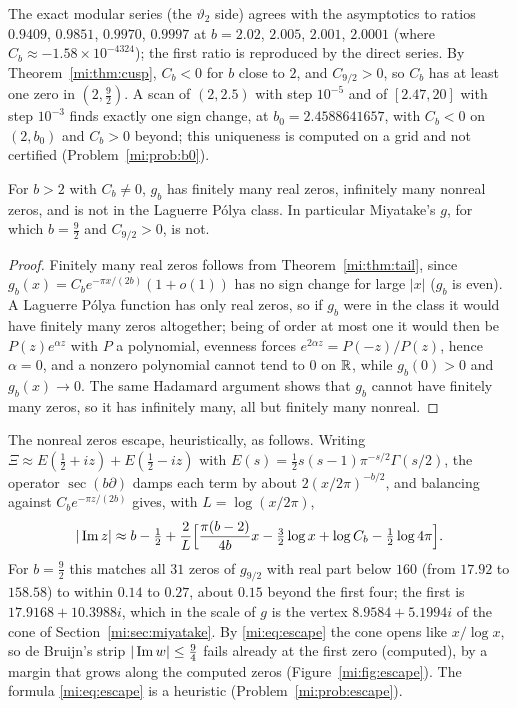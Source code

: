 The exact modular series (the $\vartheta_2$ side) agrees with the asymptotics to ratios $0.9409$, $0.9851$, $0.9970$, $0.9997$ at $b=2.02$, $2.005$, $2.001$, $2.0001$ (where $C_b\approx-1.58\times10^{-4324}$); the first ratio is reproduced by the direct series. By Theorem~\ref{mi:thm:cusp}, $C_b<0$ for $b$ close to $2$, and $C_{9/2}>0$, so $C_b$ has at least one zero in $(2,\frac92)$. A scan of $(2,2.5)$ with step $10^{-5}$ and of $[2.47,20]$ with step $10^{-3}$ finds exactly one sign change, at $b_0=2.4588641657$, with $C_b<0$ on $(2,b_0)$ and $C_b>0$ beyond; this uniqueness is computed on a grid and not certified (Problem~\ref{mi:prob:b0}).

\begin{corollary}\label{mi:cor:notLP}
For $b>2$ with $C_b\ne0$, $g_b$ has finitely many real zeros, infinitely many nonreal zeros, and is not in the Laguerre P\'olya class. In particular Miyatake's $g$, for which $b=\frac92$ and $C_{9/2}>0$, is not.
\end{corollary}

\begin{proof}
Finitely many real zeros follows from Theorem~\ref{mi:thm:tail}, since $g_b(x)=C_be^{-\pi x/(2b)}(1+o(1))$ has no sign change for large $|x|$ ($g_b$ is even). A Laguerre P\'olya function has only real zeros, so if $g_b$ were in the class it would have finitely many zeros altogether; being of order at most one it would then be $P(z)e^{\alpha z}$ with $P$ a polynomial, evenness forces $e^{2\alpha z}=P(-z)/P(z)$, hence $\alpha=0$, and a nonzero polynomial cannot tend to $0$ on $\mathbb{R}$, while $g_b(0)>0$ and $g_b(x)\to0$. The same Hadamard argument shows that $g_b$ cannot have finitely many zeros, so it has infinitely many, all but finitely many nonreal.
\end{proof}

The nonreal zeros escape, heuristically, as follows. Writing $\Xi\approx E(\frac12+iz)+E(\frac12-iz)$ with $E(s)=\frac12s(s-1)\pi^{-s/2}\Gamma(s/2)$, the operator $\sec(b\partial)$ damps each term by about $2(x/2\pi)^{-b/2}$, and balancing against $C_be^{-\pi z/(2b)}$ gives, with $L=\log(x/2\pi)$,
\begin{equation}\label{mi:eq:escape}
|\operatorname{Im} z|\approx b-\tfrac12+\frac2L\Big[\frac{\pi(b-2)}{4b}x-\tfrac32\log x+\log C_b-\tfrac12\log4\pi\Big].
\end{equation}
For $b=\frac92$ this matches all $31$ zeros of $g_{9/2}$ with real part below $160$ (from $17.92$ to $158.58$) to within $0.14$ to $0.27$, about $0.15$ beyond the first four; the first is $17.9168+10.3988i$, which in the scale of $g$ is the vertex $8.9584+5.1994i$ of the cone of Section~\ref{mi:sec:miyatake}. By \eqref{mi:eq:escape} the cone opens like $x/\log x$, so de Bruijn's strip $|\operatorname{Im} w|\le\frac94$ fails already at the first zero (computed), by a margin that grows along the computed zeros (Figure~\ref{mi:fig:escape}). The formula \eqref{mi:eq:escape} is a heuristic (Problem~\ref{mi:prob:escape}).

